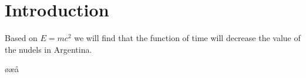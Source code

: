 \section{Introduction}

Based on $E=mc^2$ we will find that the function of time will decrease the value of the nudels in Argentina.

øæå